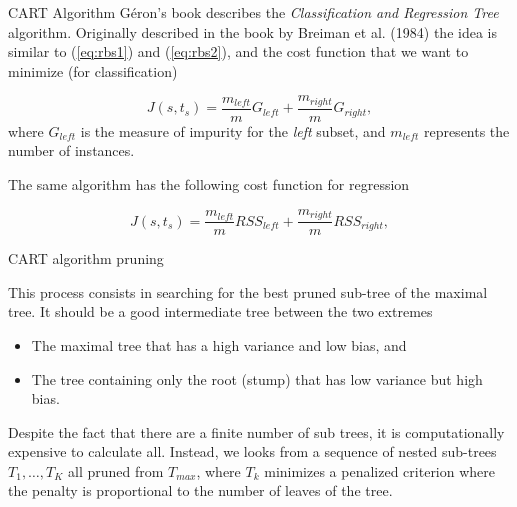 \documentclass{beamer}
\begin{document}
\begin{frame}{CART Algorithm}
	G\'eron's book describes the {\it Classification and Regression Tree}  algorithm. Originally described in the book by Breiman et al. (1984) the idea is similar to (\ref{eq:rbs1}) and (\ref{eq:rbs2}), and the cost function that we want to minimize (for classification)
	
	\begin{equation}
		J(s,t_s) = \frac{m_{left}}{m} G_{left}+ \frac{m_{right}}{m} G_{right},
	\end{equation}
where $G_{left}$ is the measure of impurity for the {\it left} subset, and $m_{left}$ represents the number of instances. 

The same algorithm has the following cost function for regression 

\begin{equation*}
	J(s,t_s)= \frac{m_{left}}{m} RSS_{left}+ \frac{m_{right}}{m} RSS_{right},
\end{equation*}

\end{frame}

\begin{frame}{CART algorithm pruning}

This process consists in searching for the best pruned sub-tree of the maximal tree.  It should be a good intermediate tree between the two extremes

\begin{itemize}
	\item The maximal tree that has a high variance and low bias, and
	\item The tree containing only the root (stump) that has low variance but high bias.
\end{itemize}

Despite the fact that there are a finite number of sub trees, it is computationally expensive to calculate all. Instead, we looks from a sequence of nested sub-trees $T_1,\ldots, T_K$ all pruned from $T_{max}$, where $T_k$ minimizes a penalized criterion where the penalty is proportional to the number of leaves of the tree. 

\end{frame} 
\end{document}
